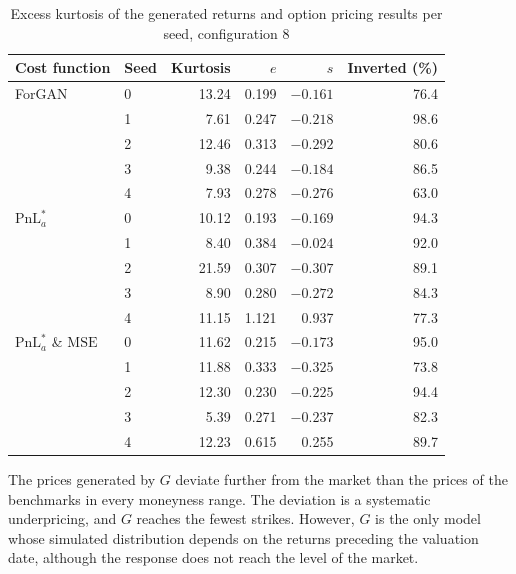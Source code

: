 \begin{table}[H]
  \centering
  \begin{tabular}{llrrrr}
    \toprule
    Cost function & Seed & Kurtosis & $e$ & $s$ & Inverted (\si{\percent}) \\
    \midrule
    ForGAN & 0 & 13.24 & 0.199 & $-0.161$ & 76.4 \\
           & 1 &  7.61 & 0.247 & $-0.218$ & 98.6 \\
           & 2 & 12.46 & 0.313 & $-0.292$ & 80.6 \\
           & 3 &  9.38 & 0.244 & $-0.184$ & 86.5 \\
           & 4 &  7.93 & 0.278 & $-0.276$ & 63.0 \\
    \addlinespace
    $\mathrm{PnL}^{*}_{a}$ & 0 & 10.12 & 0.193 & $-0.169$ & 94.3 \\
           & 1 &  8.40 & 0.384 & $-0.024$ & 92.0 \\
           & 2 & 21.59 & 0.307 & $-0.307$ & 89.1 \\
           & 3 &  8.90 & 0.280 & $-0.272$ & 84.3 \\
           & 4 & 11.15 & 1.121 & \phantom{$-$}0.937 & 77.3 \\
    \addlinespace
    $\mathrm{PnL}^{*}_{a}$ \& $\mathrm{MSE}$ & 0 & 11.62 & 0.215 & $-0.173$ & 95.0 \\
           & 1 & 11.88 & 0.333 & $-0.325$ & 73.8 \\
           & 2 & 12.30 & 0.230 & $-0.225$ & 94.4 \\
           & 3 &  5.39 & 0.271 & $-0.237$ & 82.3 \\
           & 4 & 12.23 & 0.615 & \phantom{$-$}0.255 & 89.7 \\
    \bottomrule
  \end{tabular}
  \caption[Option pricing results per seed]{Excess kurtosis of the generated returns and option pricing results per seed, configuration 8}
  \label{tab:price-error-branches}
\end{table}

The prices generated by $G$ deviate further from the market than the prices of the benchmarks in every moneyness range. The deviation is a systematic underpricing, and $G$ reaches the fewest strikes. However, $G$ is the only model whose simulated distribution depends on the returns preceding the valuation date, although the response does not reach the level of the market.